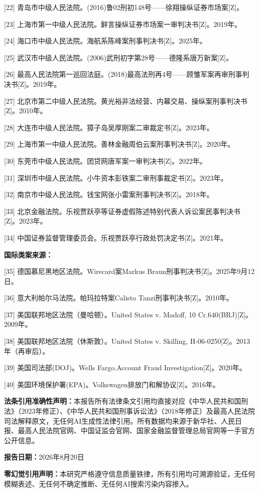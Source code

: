\documentclass[11pt,a4paper,oneside,openany]{article}
\begin{document}
[22] 青岛市中级人民法院。(2016)鲁02刑初148号——徐翔操纵证券市场案[Z]。

[23] 上海市第一中级人民法院。鲜言操纵证券市场案一审判决书[Z]。2019年。

[24] 海口市中级人民法院。海航系陈峰案刑事判决书[Z]。2025年。

[25] 武汉市中级人民法院。(2006)武刑初字第28号——德隆系唐万新案[Z]。

[26] 最高人民法院第一巡回法庭。(2018)最高法刑再4号——顾雏军案再审刑事判决书[Z]。2019年。

[27] 北京市第二中级人民法院。黄光裕非法经营、内幕交易、操纵案刑事判决书[Z]。2010年。

[28] 大连市中级人民法院。獐子岛吴厚刚案二审裁定书[Z]。2023年。

[29] 上海市第一中级人民法院。善林金融周伯云案刑事判决书[Z]。2020年。

[30] 东莞市中级人民法院。团贷网唐军案一审判决书[Z]。2022年。

[31] 深圳市中级人民法院。小牛资本彭铁案二审刑事裁定书[Z]。2023年。

[32] 南京市中级人民法院。钱宝网张小雷案刑事判决书[Z]。2018年。

[33] 北京金融法院。乐视贾跃亭等证券虚假陈述特别代表人诉讼案民事判决书[Z]。2023年。

[34] 中国证券监督管理委员会。乐视贾跃亭行政处罚决定书[Z]。2021年。

\textbf{国际类案来源：}

[35] 德国慕尼黑地区法院。Wirecard案Markus Braun刑事判决书[Z]。2025年9月12日。

[36] 意大利帕尔马法院。帕玛拉特案Calisto Tanzi刑事判决书[Z]。2010年。

[37] 美国联邦地区法院（曼哈顿）。United States v. Madoff, 10 Cr.640(BRJ)[Z]。2009年。

[38] 美国联邦地区法院（休斯敦）。United States v. Skilling, H-06-0250[Z]。2013年（再审后）。

[39] 美国司法部(DOJ)。Wells Fargo.Account Fraud Investigation[Z]。2020年。

[40] 美国环境保护署(EPA)。Volkswagen排放门和解协议[Z]。2016年。

\vfill

\noindent\textbf{法条引用准确性声明：}本报告所有法律条文引用均直接对应《中华人民共和国刑法》（2023年修正）、《中华人民共和国刑事诉讼法》（2018年修正）及最高人民法院司法解释原文，无任何AI生成性法律引用。所有数据均来源于新华社、人民日报、最高人民法院官网、中国证监会官网、国家金融监督管理总局官网等一手官方公开信息。

\noindent\textbf{报告日期：}2026年8月20日

\noindent\textbf{零幻觉引用声明：}本研究严格遵守信息质量铁律，所有引用均可溯源验证，无任何模糊表述、无任何不确定推断、无任何AI搜索污染内容掺入。
\end{document}
